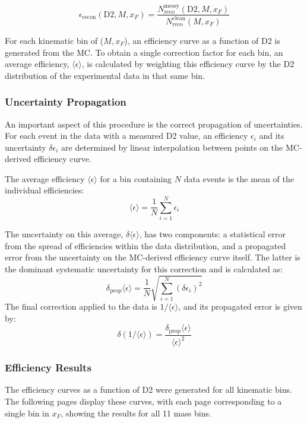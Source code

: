 \documentclass[11pt]{article}
\begin{document}
\begin{equation}
    \epsilon_{\text{recon}}(\text{D2}, M, x_F) = \frac{N_{\text{reco}}^{\text{messy}}(\text{D2}, M, x_F)}{N_{\text{reco}}^{\text{clean}}(M, x_F)}
\end{equation}

For each kinematic bin of ($M, x_F$), an efficiency curve as a function of D2 is generated from the MC. To obtain a single correction factor for each bin, an average efficiency, $\langle \epsilon \rangle$, is calculated by weighting this efficiency curve by the D2 distribution of the experimental data in that same bin.

\subsubsection{Uncertainty Propagation}
An important aspect of this procedure is the correct propagation of uncertainties. For each event in the data with a measured D2 value, an efficiency $\epsilon_{i}$ and its uncertainty $\delta\epsilon_{i}$ are determined by linear interpolation between points on the MC-derived efficiency curve.

The average efficiency $\langle\epsilon\rangle$ for a bin containing $N$ data events is the mean of the individual efficiencies:
\begin{equation} \label{eq:avg_eff_2}
    \langle\epsilon\rangle = \frac{1}{N} \sum_{i=1}^{N} \epsilon_i
\end{equation}

The uncertainty on this average, $\delta\langle\epsilon\rangle$, has two components: a statistical error from the spread of efficiencies within the data distribution, and a propagated error from the uncertainty on the MC-derived efficiency curve itself. The latter is the dominant systematic uncertainty for this correction and is calculated as:
\begin{equation} \label{eq:prop_err_2}
    \delta_{\text{prop}} \langle\epsilon\rangle = \frac{1}{N} \sqrt{\sum_{i=1}^{N} (\delta\epsilon_i)^2}
\end{equation}
The final correction applied to the data is $1/\langle\epsilon\rangle$, and its propagated error is given by:
\begin{equation} \label{eq:inv_err_2}
    \delta(1/\langle\epsilon\rangle) = \frac{\delta_{\text{prop}}\langle\epsilon\rangle}{\langle\epsilon\rangle^2}
\end{equation}

\subsubsection{Efficiency Results}
The efficiency curves as a function of D2 were generated for all kinematic bins. The following pages display these curves, with each page corresponding to a single bin in $x_F$, showing the results for all 11 mass bins.
\end{document}
